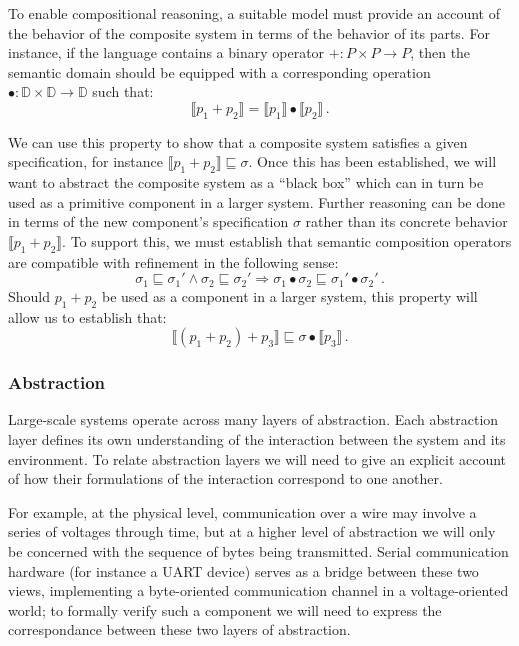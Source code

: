 To enable compositional reasoning,
a suitable model must provide an account of
the behavior of the composite system
in terms of the behavior of its parts.
For instance,
if the language contains a binary operator
${+} : P \times P \rightarrow P$,
then the semantic domain should be equipped with
a corresponding operation
${\bullet} : \mathbb{D} \times \mathbb{D} \rightarrow \mathbb{D}$
such that:
\[ \llbracket p_1 + p_2 \rrbracket =
   \llbracket p_1 \rrbracket \bullet \llbracket p_2 \rrbracket \,. \]

We can use this property
to show that a composite system
satisfies a given specification,
for instance
$\llbracket p_1 + p_2 \rrbracket \sqsubseteq \sigma$.
Once this has been established,
we will want to abstract the composite system as a ``black box''
which can in turn be used as a primitive component in a larger system.
Further reasoning can be done in terms of
the new component's specification $\sigma$ rather than
its concrete behavior $\llbracket p_1 + p_2 \rrbracket$.
To support this,
we must establish that semantic composition operators
are compatible with refinement in the following sense:
\[ \sigma_1 \sqsubseteq \sigma_1' \wedge
   \sigma_2 \sqsubseteq \sigma_2' \Rightarrow
   \sigma_1 \bullet \sigma_2 \sqsubseteq \sigma_1' \bullet \sigma_2' \,. \]
Should $p_1 + p_2$ be used as a component in a larger system,
this property will allow us to establish that:
\[ \llbracket (p_1 + p_2) + p_3 \rrbracket \sqsubseteq
   \sigma \bullet \llbracket p_3 \rrbracket \,. \]

\subsubsection{Abstraction}

Large-scale systems operate across many layers of abstraction.
Each abstraction layer defines its own understanding of the interaction
between the system and its environment.
To relate abstraction layers we will need to give an explicit account
of how their formulations of the interaction correspond to one another.

For example,
at the physical level,
communication over a wire may involve a series of voltages through time,
but at a higher level of abstraction
we will only be concerned with the sequence of bytes
being transmitted.
Serial communication hardware (for instance a UART device)
serves as a bridge between these two views,
implementing a byte-oriented communication channel
in a voltage-oriented world;
to formally verify such a component we will need to
express the correspondance between these two
layers of abstraction.

